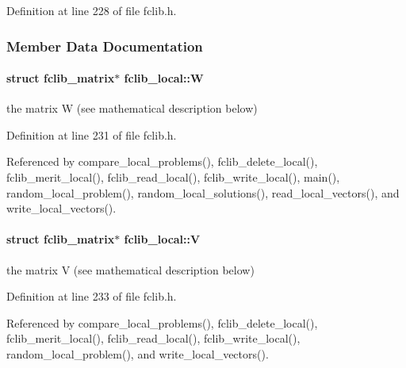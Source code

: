 Definition at line 228 of file fclib.\+h.



\subsubsection{Member Data Documentation}
\hypertarget{structfclib__local_a981b5abb9acf3f99dffe9a05602ad864}{}
\paragraph[{W}]{\setlength{\rightskip}{0pt plus 5cm}struct {\bf fclib\+\_\+matrix}$\ast$ fclib\+\_\+local\+::\+W}\label{structfclib__local_a981b5abb9acf3f99dffe9a05602ad864}


the matrix W (see mathematical description below) 



Definition at line 231 of file fclib.\+h.



Referenced by compare\+\_\+local\+\_\+problems(), fclib\+\_\+delete\+\_\+local(), fclib\+\_\+merit\+\_\+local(), fclib\+\_\+read\+\_\+local(), fclib\+\_\+write\+\_\+local(), main(), random\+\_\+local\+\_\+problem(), random\+\_\+local\+\_\+solutions(), read\+\_\+local\+\_\+vectors(), and write\+\_\+local\+\_\+vectors().

\hypertarget{structfclib__local_a516663ee92260f82283b4933f7e098cf}{}
\paragraph[{V}]{\setlength{\rightskip}{0pt plus 5cm}struct {\bf fclib\+\_\+matrix}$\ast$ fclib\+\_\+local\+::\+V}\label{structfclib__local_a516663ee92260f82283b4933f7e098cf}


the matrix V (see mathematical description below) 



Definition at line 233 of file fclib.\+h.



Referenced by compare\+\_\+local\+\_\+problems(), fclib\+\_\+delete\+\_\+local(), fclib\+\_\+merit\+\_\+local(), fclib\+\_\+read\+\_\+local(), fclib\+\_\+write\+\_\+local(), random\+\_\+local\+\_\+problem(), and write\+\_\+local\+\_\+vectors().

\hypertarget{structfclib__local_ae08751b33a0771d54d48aee48f838ced}{}
